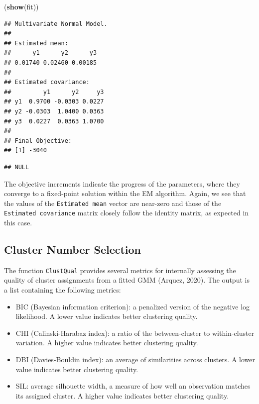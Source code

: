 \documentclass[12pt]{article}
\newenvironment{Shaded}{\begin{snugshade}}{\end{snugshade}}
\newcommand{\FunctionTok}[1]{\textcolor[rgb]{0.13,0.29,0.53}{\textbf{#1}}}
\newcommand{\NormalTok}[1]{#1}
\begin{document}
\begin{Shaded}
\begin{Highlighting}[]
\NormalTok{(}\FunctionTok{show}\NormalTok{(fit))}
\end{Highlighting}
\end{Shaded}

\begin{verbatim}
## Multivariate Normal Model. 
## 
## Estimated mean:
##      y1      y2      y3 
## 0.01740 0.02460 0.00185 
## 
## Estimated covariance:
##         y1      y2     y3
## y1  0.9700 -0.0303 0.0227
## y2 -0.0303  1.0400 0.0363
## y3  0.0227  0.0363 1.0700
## 
## Final Objective:
## [1] -3040
\end{verbatim}

\begin{verbatim}
## NULL
\end{verbatim}

The objective increments indicate the progress of the parameters, where
they converge to a fixed-point solution within the EM algorithm. Again,
we see that the values of the \texttt{Estimated\ mean} vector are
near-zero and those of the \texttt{Estimated\ covariance} matrix closely
follow the identity matrix, as expected in this case.

\hypertarget{cluster-number-selection}{%
\subsection{Cluster Number Selection}\label{cluster-number-selection}}

The function \texttt{ClustQual} provides several metrics for internally
assessing the quality of cluster assignments from a fitted GMM (Arquez,
2020). The output is a list containing the following metrics:

\begin{itemize}
\item
  BIC (Bayesian information criterion): a penalized version of the
  negative log likelihood. A lower value indicates better clustering
  quality.
\item
  CHI (Calinski-Harabaz index): a ratio of the between-cluster to
  within-cluster variation. A higher value indicates better clustering
  quality.
\item
  DBI (Davies-Bouldin index): an average of similarities across
  clusters. A lower value indicates better clustering quality.
\item
  SIL: average silhouette width, a measure of how well an observation
  matches its assigned cluster. A higher value indicates better
  clustering quality.
\end{itemize}
\end{document}
